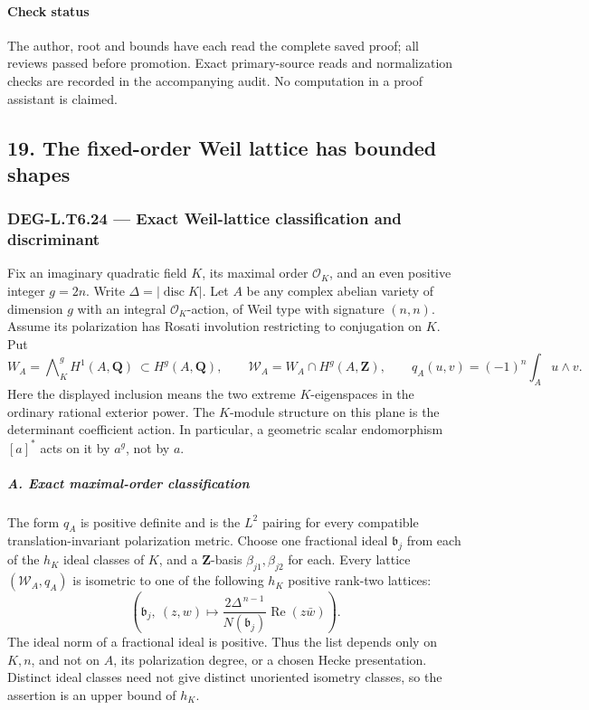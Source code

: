 \paragraph{Check status}\label{check-status-3}

The author, root and bounds have each read the complete saved proof; all reviews passed before promotion. Exact primary-source reads and normalization checks are recorded in the accompanying audit. No computation in a proof assistant is claimed.

\subsection{19. The fixed-order Weil lattice has bounded shapes}\label{the-fixed-order-weil-lattice-has-bounded-shapes}

\subsubsection{DEG-L.T6.24 --- Exact Weil-lattice classification and discriminant}\label{DEG-L.T6.24}

Fix an imaginary quadratic field \(K\), its maximal order \(\mathcal O_K\), and an even positive integer \(g=2n\). Write \(\Delta=|\operatorname{disc}K|\). Let \(A\) be any complex abelian variety of dimension \(g\) with an integral \(\mathcal O_K\)-action, of Weil type with signature \((n,n)\). Assume its polarization has Rosati involution restricting to conjugation on \(K\). Put \[
 W_A=\bigwedge\nolimits_K^g H^1(A,\mathbf Q)
       \ \subset H^g(A,\mathbf Q),\qquad
 \mathscr W_A=W_A\cap H^g(A,\mathbf Z),
 \qquad q_A(u,v)=(-1)^n\int_Au\wedge v.
 \tag{T24.1}
\] Here the displayed inclusion means the two extreme \(K\)-eigenspaces in the ordinary rational exterior power. The \(K\)-module structure on this plane is the determinant coefficient action. In particular, a geometric scalar endomorphism \([a]^*\) acts on it by \(a^g\), not by \(a\).

\subparagraph{A. Exact maximal-order classification}\label{a.-exact-maximal-order-classification}

The form \(q_A\) is positive definite and is the \(L^2\) pairing for every compatible translation-invariant polarization metric. Choose one fractional ideal \(\mathfrak b_j\) from each of the \(h_K\) ideal classes of \(K\), and a \(\mathbf Z\)-basis \(\beta_{j1},\beta_{j2}\) for each. Every lattice \((\mathscr W_A,q_A)\) is isometric to one of the following \(h_K\) positive rank-two lattices: \[
 \left(\mathfrak b_j,\ 
        (z,w)\longmapsto
        \frac{2\Delta^{\,n-1}}{N(\mathfrak b_j)}
                      \operatorname{Re}(z\bar w)\right).
 \tag{T24.2}
\] The ideal norm of a fractional ideal is positive. Thus the list depends only on \(K,n\), and not on \(A\), its polarization degree, or a chosen Hecke presentation. Distinct ideal classes need not give distinct unoriented isometry classes, so the assertion is an upper bound of \(h_K\).

